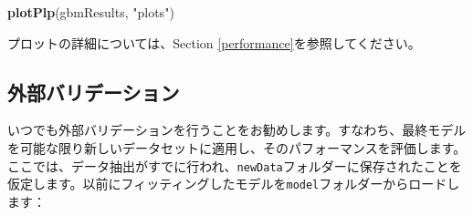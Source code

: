 \documentclass[
  11pt]{book}
\newenvironment{Shaded}{\begin{snugshade}}{\end{snugshade}}
\newcommand{\FunctionTok}[1]{\textcolor[rgb]{0.13,0.29,0.53}{\textbf{#1}}}
\newcommand{\NormalTok}[1]{#1}
\newcommand{\StringTok}[1]{\textcolor[rgb]{0.31,0.60,0.02}{#1}}
\theoremstyle{definition}
\theoremstyle{definition}
\theoremstyle{definition}
\theoremstyle{definition}
\theoremstyle{remark}
\begin{document}
\begin{Shaded}
\begin{Highlighting}[]
\FunctionTok{plotPlp}\NormalTok{(gbmResults, }\StringTok{"plots"}\NormalTok{)}
\end{Highlighting}
\end{Shaded}

プロットの詳細については、Section \ref{performance}を参照してください。

\subsection{外部バリデーション}\label{ux5916ux90e8ux30d0ux30eaux30c7ux30fcux30b7ux30e7ux30f3}

いつでも外部バリデーションを行うことをお勧めします。すなわち、最終モデルを可能な限り新しいデータセットに適用し、そのパフォーマンスを評価します。ここでは、データ抽出がすでに行われ、\texttt{newData}フォルダーに保存されたことを仮定します。以前にフィッティングしたモデルを\texttt{model}フォルダーからロードします：
\end{document}

